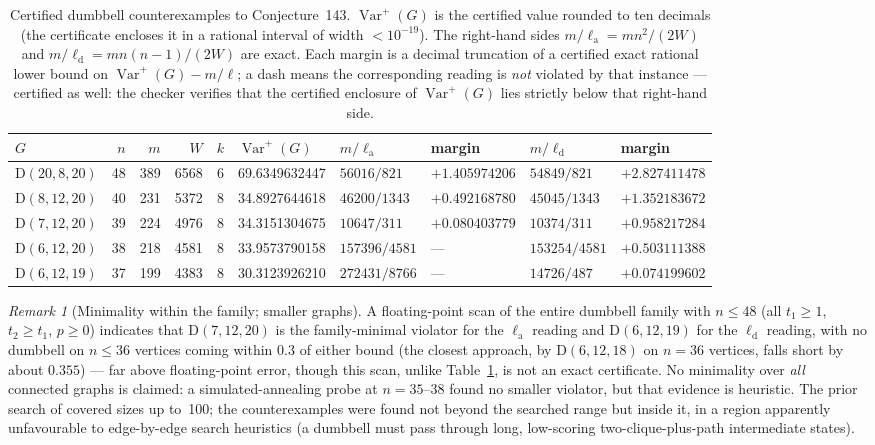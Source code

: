 \documentclass[11pt]{article}
\theoremstyle{remark}
\newtheorem{remark}[theorem]{Remark}
\newcommand{\Varp}{\operatorname{Var}^{+}}
\newcommand{\la}{\ell_{\mathrm{a}}}
\newcommand{\ld}{\ell_{\mathrm{d}}}
\newcommand{\D}{\mathrm{D}}
\begin{document}
\begin{table}[ht]
\centering\small
\setlength{\tabcolsep}{3pt}
\begin{tabular}{@{}lrrrrlllll@{}}
\toprule
$G$ & $n$ & $m$ & $W$ & $k$ & $\Varp(G)$ &
$m/\la$ & margin & $m/\ld$ & margin \\
\midrule
$\D(20,8,20)$ & 48 & 389 & 6568 & 6 & 69.6349632447 & $56016/821$  & $+1.405974206$ & $54849/821$  & $+2.827411478$ \\
$\D(8,12,20)$ & 40 & 231 & 5372 & 8 & 34.8927644618 & $46200/1343$ & $+0.492168780$ & $45045/1343$ & $+1.352183672$ \\
$\D(7,12,20)$ & 39 & 224 & 4976 & 8 & 34.3151304675 & $10647/311$  & $+0.080403779$ & $10374/311$  & $+0.958217284$ \\
$\D(6,12,20)$ & 38 & 218 & 4581 & 8 & 33.9573790158 & $157396/4581$ & ---           & $153254/4581$ & $+0.503111388$ \\
$\D(6,12,19)$ & 37 & 199 & 4383 & 8 & 30.3123926210 & $272431/8766$ & ---           & $14726/487$  & $+0.074199602$ \\
\bottomrule
\end{tabular}
\caption{Certified dumbbell counterexamples to Conjecture~143. $\Varp(G)$ is
the certified value rounded to ten decimals (the certificate encloses it in a
rational interval of width $<10^{-19}$). The right-hand sides
$m/\la = mn^2/(2W)$ and $m/\ld = mn(n-1)/(2W)$ are exact. Each margin is a
decimal truncation of a certified exact rational lower bound on
$\Varp(G) - m/\ell$; a dash means the corresponding reading is \emph{not}
violated by that instance --- certified as well: the checker verifies that
the certified enclosure of $\Varp(G)$ lies strictly below that right-hand
side.}
\label{tab:143}
\end{table}

\begin{remark}[Minimality within the family; smaller graphs]\label{rem:143min}
A floating-point scan of the entire dumbbell family with $n \le 48$ (all
$t_1 \ge 1$, $t_2 \ge t_1$, $p \ge 0$) indicates that $\D(7,12,20)$ is the
family-minimal violator for the $\la$ reading and $\D(6,12,19)$ for the
$\ld$ reading, with no dumbbell on $n \le 36$ vertices coming within $0.3$
of either bound (the closest approach, by $\D(6,12,18)$ on $n = 36$
vertices, falls short by about $0.355$) --- far above floating-point error,
though this scan, unlike
Table~\ref{tab:143}, is not an exact certificate. No minimality over
\emph{all} connected graphs is claimed: a simulated-annealing probe at
$n = 35$--$38$ found no smaller violator, but that evidence is heuristic.
The prior search of \cite{RoucairolCazenave2025} covered sizes up to~100;
the counterexamples were found not beyond the searched range but inside it,
in a region apparently unfavourable to edge-by-edge search heuristics (a
dumbbell must pass through long, low-scoring two-clique-plus-path
intermediate states).
\end{remark}
\end{document}
